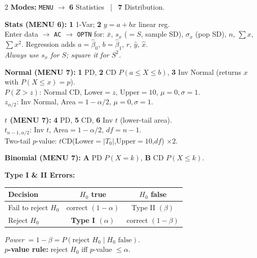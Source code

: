 \documentclass[9pt,a4paper]{extarticle}
\renewcommand{\arraystretch}{1.1}
\newcommand{\sh}[1]{\textbf{\color{BrickRed} #1}}
\begin{document}
\begin{multicols*}{2}
\sh{Modes:} \texttt{MENU} $\to$ \textbf{6} Statistics \ | \ \textbf{7} Distribution.

\sh{Stats (MENU 6):} \textbf{1} 1-Var; \textbf{2} $y=a+bx$ linear reg.\\
Enter data $\to$ \texttt{AC} $\to$ \texttt{OPTN} for: $\bar{x}$, $s_x$ ($=S$, sample SD), $\sigma_x$ (pop SD), $n$, $\sum x$, $\sum x^2$. Regression adds $a\!=\!\hat{\beta}_0$, $b\!=\!\hat{\beta}_1$, $r$, $\hat{y}$, $\hat{x}$.\\
\textit{Always use $s_x$ for $S$; square it for $S^2$.}

\sh{Normal (MENU 7):} \textbf{1} PD, \textbf{2} CD $P(a\!\le\!X\!\le\!b)$, \textbf{3} Inv Normal (returns $x$ with $P(X\!\le\!x)=p$).\\
$P(Z>z)$: Normal CD, Lower$=z$, Upper$=10$, $\mu\!=\!0,\sigma\!=\!1$.\\
$z_{\alpha/2}$: Inv Normal, Area$=1-\alpha/2$, $\mu\!=\!0,\sigma\!=\!1$.

\sh{$t$ (MENU 7):} \textbf{4} PD, \textbf{5} CD, \textbf{6} Inv $t$ (lower-tail area).\\
$t_{n-1,\alpha/2}$: Inv $t$, Area$=1-\alpha/2$, $df\!=\!n-1$.\\
Two-tail $p$-value: $t$CD(Lower$=|T_0|$,Upper$=10$,$df$) $\times 2$.

\sh{Binomial (MENU 7):} \textbf{A} PD $P(X\!=\!k)$, \textbf{B} CD $P(X\!\le\!k)$.

\sh{Type I \& II Errors:}
\begin{center}\scriptsize
\renewcommand{\arraystretch}{1.0}
\setlength{\tabcolsep}{2.5pt}
\begin{tabular}{@{}lcc@{}}
\toprule
Decision & $H_0$ true & $H_0$ false \\
\midrule
Fail to reject $H_0$ & correct $(1\!-\!\alpha)$ & Type II $(\beta)$ \\
Reject $H_0$ & \textbf{Type I $(\alpha)$} & correct $(1\!-\!\beta)$ \\
\bottomrule
\end{tabular}
\end{center}
\textit{Power} $=1-\beta=P(\text{reject }H_0\mid H_0\text{ false})$.\\
\sh{$p$-value rule:} reject $H_0$ iff $p$-value $\le\alpha$.

\end{multicols*}
\end{document}
